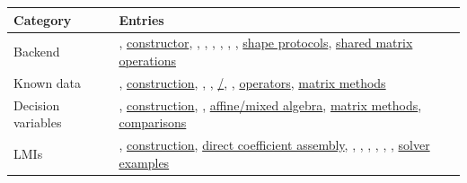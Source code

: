 \begin{tabularx}{\textwidth}{@{}lY@{}}
\toprule
Category & Entries \\
\midrule
Backend &
\hyperref[sec:pdbase]{},
\hyperref[sec:pdbase-constructor]{constructor},
\hyperref[sec:pdbase-inspection]{},
\hyperref[sec:pdbase-inspection]{},
\hyperref[sec:pdbase-inspection]{},
\hyperref[sec:pdbase-counts]{},
\hyperref[sec:pdbase-counts]{},
\hyperref[sec:pdbase-counts]{},
\hyperref[sec:pdbase-shape]{shape protocols},
\hyperref[sec:pdbase-matrix-ops]{shared matrix operations} \\
Known data &
\hyperref[sec:pdmat]{},
\hyperref[sec:pdmat-construction]{construction},
\hyperref[sec:pdmat-evaluate]{},
\hyperref[sec:pdmat-table]{},
\hyperref[sec:pdmat-display]{/},
\hyperref[sec:pdmat-plot]{},
\hyperref[sec:pdmat-algebra]{operators},
\hyperref[sec:pdmat-matrix-ops]{matrix methods} \\
Decision variables &
\hyperref[sec:pdvar]{},
\hyperref[sec:pdvar-construction]{construction},
\hyperref[sec:pdvar-rhodiff]{},
\hyperref[sec:pdvar-algebra]{affine/mixed algebra},
\hyperref[sec:pdvar-matrix-ops]{matrix methods},
\hyperref[sec:pdvar-comparison]{comparisons} \\
LMIs &
\hyperref[sec:pdlmi]{},
\hyperref[sec:pdlmi-construction]{construction},
  \hyperref[sec:pdlmi-direct]{direct coefficient assembly},
  \hyperref[sec:pdlmi-polya]{},
  \hyperref[sec:pdlmi-putinar]{},
  \hyperref[sec:pdlmi-sparse-putinar]{},
  \hyperref[sec:pdlmi-sparse-full-box]{},
  \hyperref[sec:pdlmi-full-box]{},
\hyperref[sec:pdlmi-toyalmip]{},
\hyperref[sec:examples]{solver examples} \\
\bottomrule
\end{tabularx}
